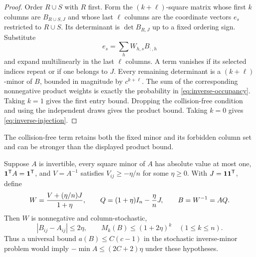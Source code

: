 \begin{proof}
Order $R\cup S$ with $R$ first.  Form the $(k+\ell)$-square
matrix whose first $k$ columns are $B_{R\cup S,J}$ and whose
last $\ell$ columns are the coordinate vectors $e_s$ restricted to
$R\cup S$.  Its determinant is $\det B_{R,J}$ up to a fixed
ordering sign.  Substitute
\[
 e_s=\sum_h W_{h,s}B_{:,h}
\]
and expand multilinearly in the last $\ell$ columns.  A term
vanishes if its selected indices repeat or if one belongs to $J$.
Every remaining determinant is a $(k+\ell)$-minor of $B$, bounded
in magnitude by $c^{k+\ell}$.  The sum of the corresponding
nonnegative product weights is exactly the probability in
\eqref{eq:inverse-occupancy}.  Taking $k=1$ gives the first entry
bound.  Dropping the collision-free condition and using the
independent draws gives the product bound.  Taking $k=0$ gives
\eqref{eq:inverse-injection}.
\end{proof}

The collision-free term retains both the fixed minor and its
forbidden column set and can be stronger than the displayed product
bound.

\begin{proposition}
\label{prop:inverse-regularization}
Suppose $A$ is invertible, every square minor of $A$ has absolute
value at most one, $\mathbf 1^{\mathsf T}A=\mathbf 1^{\mathsf T}$, and
$V=A^{-1}$ satisfies
$V_{ij}\geq-\eta/n$ for some $\eta\geq0$.  With
$J=\mathbf 1\mathbf 1^{\mathsf T}$, define
\[
 W=\frac{V+(\eta/n)J}{1+\eta},\qquad
 Q=(1+\eta)I_n-\frac\eta n J,\qquad B=W^{-1}=AQ.
\]
Then $W$ is nonnegative and column-stochastic,
\begin{equation}
 |B_{ij}-A_{ij}|\leq2\eta,
 \qquad M_k(B)\leq(1+2\eta)^k\quad(1\leq k\leq n).
 \label{eq:inverse-regularization}
\end{equation}
Thus a universal bound $a(B)\leq C(c-1)$ in the stochastic
inverse-minor problem would imply
$-\min A\leq(2C+2)\eta$ under these hypotheses.
\end{proposition}

